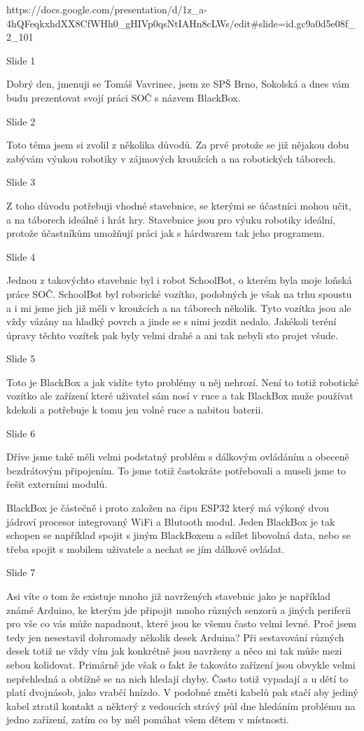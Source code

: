 https://docs.google.com/presentation/d/1z_a-4hQFeqkxhdXX8CfWHh0_gHIVp0qsNtIAHn8cLWs/edit#slide=id.gc9a0d5e08f_2_101

Slide 1

Dobrý den, jmenuji se Tomáš Vavrinec, jsem ze SPŠ Brno, Sokolská
a dnes vám budu prezentovat 
svojí práci SOČ s názvem BlackBox.

Slide 2

Toto téma jsem si zvolil z několika důvodů. Za prvé protože se již nějakou dobu zabývám 
výukou robotiky v zájmových kroužcích a na robotických táborech. 


Slide 3

Z toho důvodu potřebuji 
vhodné stavebnice, se kterými se účastníci mohou učit, a na táborech ideálně i hrát hry.
Stavebnice jsou pro výuku robotiky ideální, protože účastníkům umožňují práci jak 
s hárdwarem tak jeho programem.

Slide 4

Jednou z takovýchto stavebnic byl i robot SchoolBot, o kterém byla moje loňská práce SOČ.
SchoolBot byl roborické vozítko, podobných je však na trhu spoustu a i mi jsme jich již měli v kroužcích
a na táborech několik. Tyto vozítka jsou ale vždy vázány na hladký povrch a jinde se s nimi jezdit nedalo.
Jakékoli teréní úpravy těchto vozítek pak byly velmi drahé a ani tak nebyli sto projet všude.

Slide 5

Toto je BlackBox a jak vidíte tyto problémy u něj nehrozí. Není to totiž robotické vozítko ale zařízení které uživatel
sám nosí v ruce a tak BlackBox muže používat kdekoli a potřebuje k tomu jen volné ruce a nabitou baterii.



Slide 6

Dříve jsme také měli velmi podstatný problém s dálkovým ovládáním a obeceně bezdrátovým připojením.
To jsme totiž častokráte potřebovali a museli jsme to řešit externími modulů.

BlackBox je částečně i proto založen na čipu ESP32 který má výkoný dvou jádroví procesor integrovaný WiFi a Blutooth modul. 
Jeden BlackBox je tak schopen se například spojit s jiným BlackBoxem a sdílet libovolná data, 
nebo se třeba spojit s mobilem uživatele a nechat se jím dálkově ovládat. %



Slide 7

Asi víte o tom že existuje mnoho již navržených stavebnic jako je například známé Arduino, 
ke kterým jde připojit mnoho různých senzorů a jiných periferii pro vše co vás může napadnout, které jsou ke všemu 
často velmi levné. 
Proč jsem tedy jen nesestavil dohromady několik desek Arduina? Při sestavování různých desek
totiž ne vždy vím jak konkrétně jsou navrženy a něco mi tak může mezi sebou kolidovat.
Primárně jde však o fakt že takováto zařízení jsou obvykle velmi nepřehledná a obtížně 
se na nich hledají chyby. Často totiž vypadají a u dětí to platí dvojnásob, jako vrabčí hnízdo.
V podobné změti kabelů pak stačí aby jediný kabel ztratil kontakt a některý z vedoucích 
strávý půl dne hledáním problému na jedno zařízení, zatím co by měl pomáhat všem dětem v místnosti.

